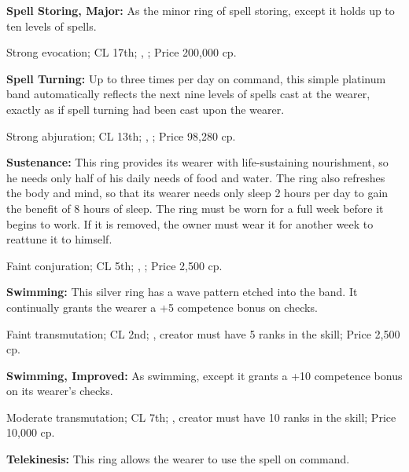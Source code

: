 \textbf{Spell Storing, Major:} As the minor ring of spell storing, except it holds up to ten levels of spells.

Strong evocation; CL 17th; , ; Price 200,000 cp.


\textbf{Spell Turning:} Up to three times per day on command, this simple platinum band automatically reflects the next nine levels of spells cast at the wearer, exactly as if spell turning had been cast upon the wearer.

Strong abjuration; CL 13th; , ; Price 98,280 cp.


\textbf{Sustenance:} This ring provides its wearer with life-sustaining nourishment, so he needs only half of his daily needs of food and water. The ring also refreshes the body and mind, so that its wearer needs only sleep 2 hours per day to gain the benefit of 8 hours of sleep. The ring must be worn for a full week before it begins to work. If it is removed, the owner must wear it for another week to reattune it to himself.

Faint conjuration; CL 5th; , ; Price 2,500 cp.





\textbf{Swimming:} This silver ring has a wave pattern etched into the band. It continually grants the wearer a +5 competence bonus on  checks.

Faint transmutation; CL 2nd; , creator must have 5 ranks in the  skill; Price 2,500 cp.


\textbf{Swimming, Improved:} As swimming, except it grants a +10 competence bonus on its wearer's  checks.

Moderate transmutation; CL 7th; , creator must have 10 ranks in the  skill; Price 10,000 cp.


\textbf{Telekinesis:} This ring allows the wearer to use the spell  on command.

